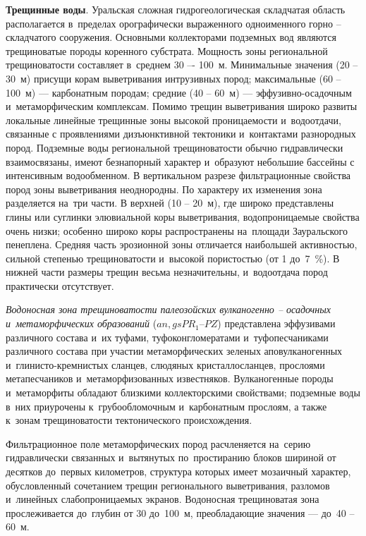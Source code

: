 \textbf{Трещинные воды}. Уральская сложная гидрогеологическая складчатая область располагается в~пределах орографически выраженного одноименного горно -- складчатого сооружения. Основными коллекторами подземных вод являются трещиноватые породы коренного субстрата. Мощность зоны региональной трещиноватости составляет в~среднем 30 –- 100~м. Минимальные значения (20 -- 30~м) присущи корам выветривания интрузивных пород; максимальные (60  -- 100~м)  --- карбонатным породам; средние (40 -- 60~м) --- эффузивно-осадочным и~метаморфическим комплексам. Помимо трещин выветривания широко развиты локальные линейные трещинные зоны высокой проницаемости и~водоотдачи, связанные с проявлениями дизъюнктивной тектоники и~контактами разнородных пород. Подземные воды региональной трещиноватости обычно гидравлически взаимосвязаны, имеют безнапорный характер и~образуют небольшие бассейны с интенсивным водообменном. В вертикальном разрезе фильтрационные свойства пород зоны выветривания неоднородны. По характеру их изменения зона разделяется на~три части. В верхней (10 -- 20~м), где широко представлены глины или суглинки элювиальной коры выветривания, водопроницаемые свойства очень низки; особенно широко коры распространены на~площади Зауральского пенеплена. Средняя часть эрозионной зоны отличается наибольшей активностью, сильной степенью трещиноватости и~высокой пористостью (от 1 до~7~\%). В нижней части размеры трещин весьма незначительны, и~водоотдача пород практически отсутствует.

\textit{Водоносная зона трещиноватости палеозойских вулканогенно -- осадочных и~метаморфических образований} ($an, gsPR_1–PZ$) представлена эффузивами различного состава и~их туфами, туфоконгломератами и~туфопесчаниками различного состава при участии метаморфических зеленых аповулканогенных и~глинисто-кремнистых сланцев, слюдяных кристаллосланцев, прослоями метапесчаников и~метаморфизованных известняков. Вулканогенные породы и~метаморфиты обладают близкими коллекторскими свойствами; подземные воды в~них приурочены к~грубообломочным и~карбонатным прослоям, а также к~зонам трещиноватости тектонического происхождения. 

Фильтрационное поле метаморфических пород расчленяется на~серию гидравлически связанных и~вытянутых по~простиранию блоков шириной от десятков до~первых километров, структура которых имеет мозаичный характер, обусловленный сочетанием трещин регионального выветривания, разломов и~линейных слабопроницаемых экранов. Водоносная трещиноватая зона прослеживается до~глубин от 30 до~100~м, преобладающие значения --- до~40 -- 60~м.

